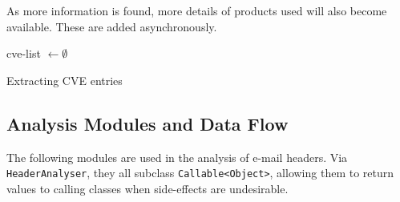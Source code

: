 As more information is found, more details of products used will also become
available.  These are added asynchronously.

\begin{algorithm}
	cve-list $\gets\emptyset$\;
	\;
	\caption{Extracting CVE entries}
\end{algorithm}

\subsection{Analysis Modules and Data Flow}

The following modules are used in the analysis of e-mail headers. Via
\texttt{HeaderAnalyser}, they all subclass \texttt{Callable<Object>}, allowing
them to return values to calling classes when side-effects are undesirable.

